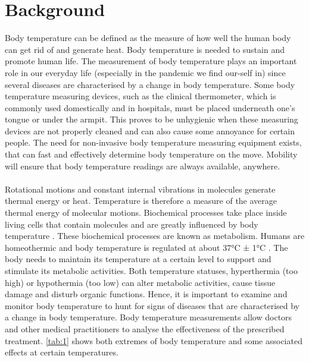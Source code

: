 \section{Background}
Body temperature can be defined as the measure of how well the human body can get rid of and generate heat. Body temperature is needed to sustain and promote human life. The measurement of body temperature plays an important role in our everyday life (especially in the pandemic we find our-self in) since several diseases are characterised by a change in body temperature. Some body temperature measuring devices, such as the clinical thermometer, which is commonly used domestically and in hospitals, must be placed underneath one's tongue or under the armpit. This proves to be unhygienic when these measuring devices are not properly cleaned and can also cause some annoyance for certain people. The need for non-invasive body temperature measuring equipment exists, that can fast and effectively determine body temperature on the move. Mobility will ensure that body temperature readings are always available, anywhere. 
\\
\\
Rotational motions and constant internal vibrations in molecules generate thermal energy or heat. Temperature is therefore a measure of the average thermal energy of molecular motions. Biochemical processes take place inside living cells that contain molecules and are greatly influenced by body temperature \cite{Chen2019}. These biochemical processes are known as metabolism. Humans are homeothermic and body temperature is regulated at about 37°C ± 1°C \cite{Wong2015}. The body needs to maintain its temperature at a certain level to support and stimulate its metabolic activities. Both temperature statuses, hyperthermia (too high) or hypothermia (too low) can alter metabolic activities, cause tissue damage and disturb organic functions. Hence, it is important to examine and monitor body temperature to hunt for signs of diseases that are characterised by a change in body temperature. Body temperature measurements allow doctors and other medical practitioners to analyse the effectiveness of the prescribed treatment. 
\autoref{tab:1} shows both extremes of body temperature and some associated effects at certain temperatures. 

